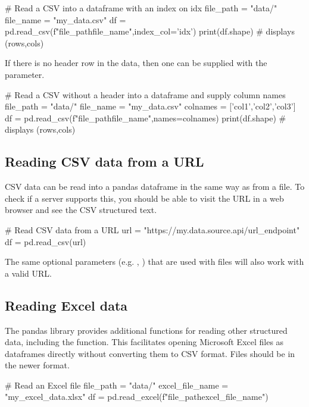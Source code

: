 \begin{pycode}
    # Read a CSV into a dataframe with an index on idx
    file_path = "data/"
    file_name = "my_data.csv"
    df = pd.read_csv(f"{file_path}{file_name}",index_col='idx')
    print(df.shape) # displays (rows,cols)
\end{pycode}

\newpage
If there is no header row in the data, then one can be supplied with the  parameter.

\begin{pycode}
    # Read a CSV without a header into a dataframe and supply column names
    file_path = "data/"
    file_name = "my_data.csv"
    colnames = ['col1','col2','col3']
    df = pd.read_csv(f"{file_path}{file_name}",names=colnames)
    print(df.shape) # displays (rows,cols)
\end{pycode}


\subsection{Reading CSV data from a URL}

CSV data can be read into a pandas dataframe in the same way as from a file. To check if a server supports this, you should be able to visit the URL in a web browser and see the CSV structured text.

\begin{pycode}
    # Read CSV data from a URL
    url =  "https://my.data.source.api/url_endpoint"
    df = pd.read_csv(url)
\end{pycode}

The same optional parameters (e.g. , ) that are used with files will also work with a valid URL.

\subsection{Reading Excel data}

The pandas library provides additional functions for reading other structured data, including the  function. This facilitates opening Microsoft Excel files as dataframes directly without converting them to CSV format. Files should be in the newer  format.

\begin{pycode}
    # Read an Excel file
    file_path = "data/"
    excel_file_name = "my_excel_data.xlsx"
    df = pd.read_excel(f"{file_path}{excel_file_name}")
\end{pycode}

